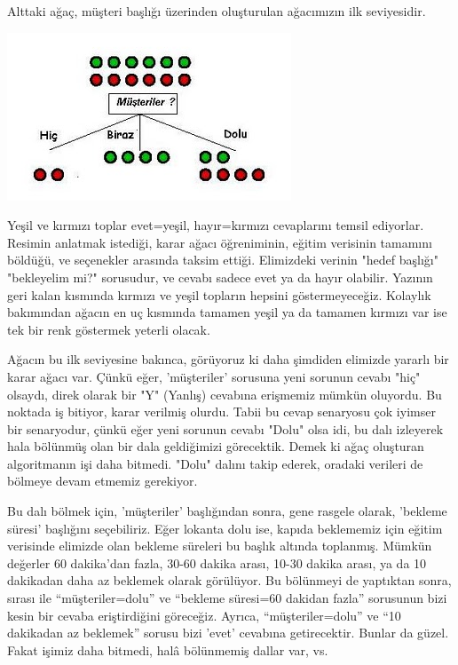 \documentclass[12pt,fleqn]{article}\usepackage{../../common}
\begin{document}
Alttaki ağaç, müşteri başlığı üzerinden oluşturulan ağacımızın ilk
seviyesidir.

\includegraphics[height=5cm]{id3_hangi_baslik_1.jpg}

Yeşil ve kırmızı toplar evet=yeşil, hayır=kırmızı cevaplarını temsil
ediyorlar. Resimin anlatmak istediği, karar ağacı öğreniminin, eğitim
verisinin tamamını böldüğü, ve seçenekler arasında taksim
ettiği. Elimizdeki verinin "hedef başlığı" "bekleyelim mi?" sorusudur, ve
cevabı sadece evet ya da hayır olabilir. Yazının geri kalan kısmında
kırmızı ve yeşil topların hepsini göstermeyeceğiz. Kolaylık bakımından
ağacın en uç kısmında tamamen yeşil ya da tamamen kırmızı var ise tek bir
renk göstermek yeterli olacak.

Ağacın bu ilk seviyesine bakınca, görüyoruz ki daha şimdiden elimizde
yararlı bir karar ağacı var. Çünkü eğer, 'müşteriler' sorusuna yeni sorunun
cevabı "hiç" olsaydı, direk olarak bir "Y" (Yanlış) cevabına erişmemiz
mümkün oluyordu. Bu noktada iş bitiyor, karar verilmiş olurdu. Tabii bu
cevap senaryosu çok iyimser bir senaryodur, çünkü eğer yeni sorunun cevabı
"Dolu" olsa idi, bu dalı izleyerek hala bölünmüş olan bir dala geldiğimizi
görecektik. Demek ki ağaç oluşturan algoritmanın işi daha bitmedi. "Dolu"
dalını takip ederek, oradaki verileri de bölmeye devam etmemiz gerekiyor.

Bu dalı bölmek için, 'müşteriler' başlığından sonra, gene rasgele olarak,
'bekleme süresi' başlığını seçebiliriz. Eğer lokanta dolu ise, kapıda
beklememiz için eğitim verisinde elimizde olan bekleme süreleri bu başlık
altında toplanmış. Mümkün değerler 60 dakika'dan fazla, 30-60 dakika arası,
10-30 dakika arası, ya da 10 dakikadan daha az beklemek olarak
görülüyor. Bu bölünmeyi de yaptıktan sonra, sırası ile ``müşteriler=dolu''
ve ``bekleme süresi=60 dakidan fazla'' sorusunun bizi kesin bir cevaba
eriştirdiğini göreceğiz. Ayrıca, ``müşteriler=dolu'' ve ``10 dakikadan az
beklemek'' sorusu bizi 'evet' cevabına getirecektir. Bunlar da güzel. Fakat
işimiz daha bitmedi, halâ bölünmemiş dallar var, vs.
\end{document}
